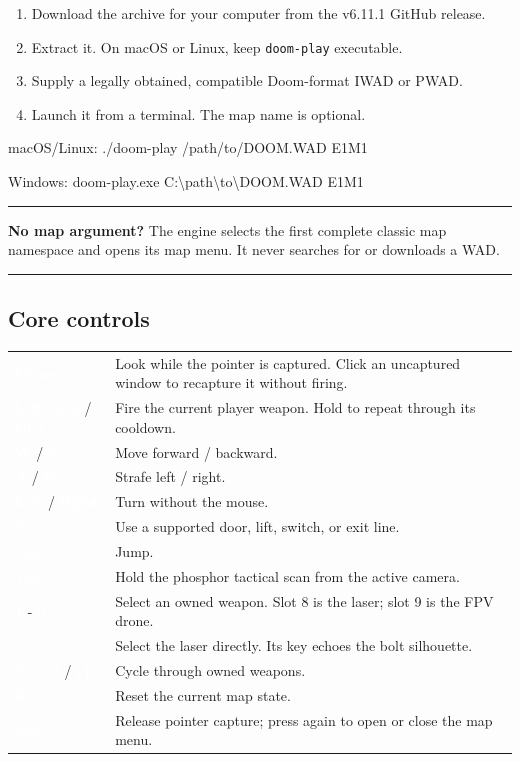 \documentclass[10pt]{article}
\newcommand{\key}[1]{%
  \begingroup
  \setlength{\fboxsep}{2.5pt}%
  \colorbox{Ink}{\textcolor{white}{\sffamily\bfseries\footnotesize #1}}%
  \endgroup
}
\newcommand{\commandline}[1]{%
  \begingroup
  \setlength{\fboxsep}{6pt}%
  \colorbox{Ink}{\parbox{\dimexpr\linewidth-2\fboxsep}{%
    \textcolor{LaserGreen}{\ttfamily\small #1}}}%
  \endgroup
}
\newenvironment{guidepanel}[2]{%
  \par\medskip
  \begingroup
  \def\GuidePanelAccent{#1}%
  \color{#1}\hrule height 1.4pt
  \vspace{5pt}%
  \color{Ink}%
  \noindent\begin{minipage}{\linewidth}
}{%
  \end{minipage}%
  \vspace{4pt}%
  \color{\GuidePanelAccent}\hrule height 0.5pt
  \endgroup
  \par\medskip
}
\begin{document}
\begin{enumerate}
  \item Download the archive for your computer from the v6.11.1 GitHub release.
  \item Extract it. On macOS or Linux, keep \texttt{doom-play} executable.
  \item Supply a legally obtained, compatible Doom-format IWAD or PWAD.
  \item Launch it from a terminal. The map name is optional.
\end{enumerate}

\commandline{macOS/Linux: ./doom-play /path/to/DOOM.WAD E1M1}
\vspace{4pt}
\commandline{Windows: doom-play.exe C:\textbackslash path\textbackslash to\textbackslash DOOM.WAD E1M1}

\begin{guidepanel}{LaserGreen}{PaleGreen}
\textbf{No map argument?} The engine selects the first complete classic map
namespace and opens its map menu. It never searches for or downloads a WAD.
\end{guidepanel}

\subsection*{Core controls}

\begin{tabularx}{\linewidth}{K Y}
\key{Mouse} & Look while the pointer is captured. Click an uncaptured window to recapture it without firing. \\
\key{Left click} / \key{Ctrl} & Fire the current player weapon. Hold to repeat through its cooldown. \\
\key{W} / \key{S} & Move forward / backward. \\
\key{A} / \key{D} & Strafe left / right. \\
\key{Left} / \key{Right} & Turn without the mouse. \\
\key{E} & Use a supported door, lift, switch, or exit line. \\
\key{Space} & Jump. \\
\key{Tab} & Hold the phosphor tactical scan from the active camera. \\
\key{1}-\key{9} & Select an owned weapon. Slot 8 is the laser; slot 9 is the FPV drone. \\
\key{-} & Select the laser directly. Its key echoes the bolt silhouette. \\
\key{Wheel} / \key{[} \key{]} & Cycle through owned weapons. \\
\key{R} & Reset the current map state. \\
\key{Esc} & Release pointer capture; press again to open or close the map menu. \\
\end{tabularx}
\end{document}
